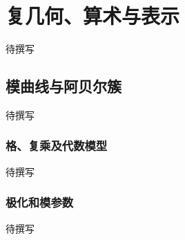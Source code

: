 
% 
% 
% 
% 
% 
% 
% 
% 
% 

\chapter{复几何、算术与表示}
\label{g4:app:F}

待撰写

\section{模曲线与阿贝尔簇}
\label{g4:sec:F01}
待撰写

\subsection{格、复乘及代数模型}
\label{g4:subsec:F01:01}
待撰写

\subsection{极化和模参数}
\label{g4:subsec:F01:02}
待撰写

